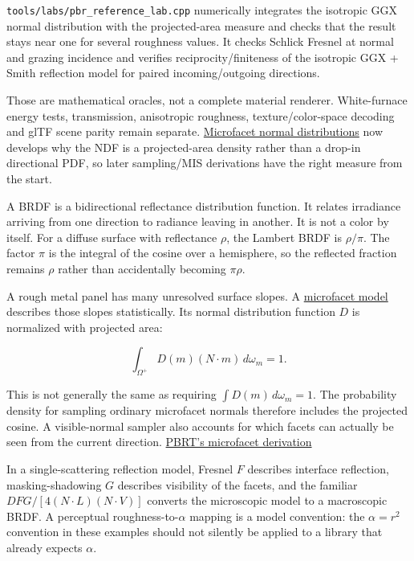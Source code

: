 \texttt{tools/labs/pbr\_reference\_lab.cpp} numerically integrates the isotropic GGX normal distribution with the projected-area measure and checks that the result stays near one for several roughness values. It checks Schlick Fresnel at normal and grazing incidence and verifies reciprocity/finiteness of the isotropic GGX + Smith reflection model for paired incoming/outgoing directions.

Those are mathematical oracles, not a complete material renderer. White-furnace energy tests, transmission, anisotropic roughness, texture/color-space decoding and glTF scene parity remain separate. \hyperref[appendix-885c1cb64ae9]{Microfacet normal distributions} now develops why the NDF is a projected-area density rather than a drop-in directional PDF, so later sampling/MIS derivations have the right measure from the start.

A BRDF is a bidirectional reflectance distribution function. It relates irradiance arriving from one direction to radiance leaving in another. It is not a color by itself. For a diffuse surface with reflectance \(\rho\), the Lambert BRDF is \(\rho/\pi\). The factor \(\pi\) is the integral of the cosine over a hemisphere, so the reflected fraction remains \(\rho\) rather than accidentally becoming \(\pi\rho\).

A rough metal panel has many unresolved surface slopes. A \hyperref[appendix-885c1cb64ae9]{microfacet model} describes those slopes statistically. Its normal distribution function \(D\) is normalized with projected area:

\[
\int_{\Omega^+} D(m)(N\cdot m)\,d\omega_m=1.
\]

This is not generally the same as requiring \(\int D(m)\,d\omega_m=1\). The probability density for sampling ordinary microfacet normals therefore includes the projected cosine. A visible-normal sampler also accounts for which facets can actually be seen from the current direction. \href{https://pbr-book.org/4ed/Reflection_Models/Roughness_Using_Microfacet_Theory}{PBRT's microfacet derivation}

In a single-scattering reflection model, Fresnel \(F\) describes interface reflection, masking-shadowing \(G\) describes visibility of the facets, and the familiar \(DFG/[4(N\cdot L)(N\cdot V)]\) converts the microscopic model to a macroscopic BRDF. A perceptual roughness-to-\(\alpha\) mapping is a model convention: the \(\alpha=r^2\) convention in these examples should not silently be applied to a library that already expects \(\alpha\).

